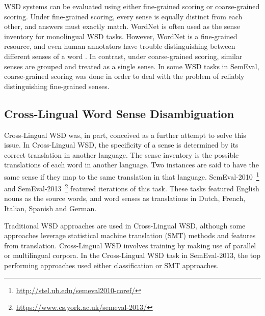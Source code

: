 WSD systems can be evaluated using either fine-grained scoring or
coarse-grained scoring. Under fine-grained scoring, every sense is
equally distinct from each other, and answers must exactly match. 
WordNet is often used as the sense inventory for monolingual WSD tasks. However, WordNet is a fine-grained resource, and even human annotators have
trouble distinguishing between different senses of a word
\cite{edmonds2002introduction}.  In contrast, under coarse-grained
scoring, similar senses are grouped and treated as a single sense.  In
some WSD tasks in SemEval, coarse-grained scoring was done in order
to deal with the problem of reliably distinguishing fine-grained
senses. 

\subsection{Cross-Lingual Word Sense Disambiguation}
Cross-Lingual WSD was, in part, conceived as a further attempt to
solve this issue. In Cross-Lingual WSD, the specificity of a sense is
determined by its correct translation in another language. The sense
inventory is the possible translations of each word in another
language. Two instances are said to have the same sense if they map to
the same translation in that language.
SemEval-2010~\cite{Lefever2010}\footnote{\url{http://stel.ub.edu/semeval2010-coref/}}
and SemEval-2013~\cite{Lefever2013}\footnote{\url{https://www.cs.york.ac.uk/semeval-2013/}}
featured iterations of this task. These tasks featured
English nouns as the source words, and word senses as translations in
Dutch, French, Italian, Spanish and German.

Traditional WSD approaches are used in Cross-Lingual WSD, although
some approaches leverage statistical machine translation (SMT) methods
and features from translation. Cross-Lingual WSD involves training by
making use of parallel or multilingual corpora. In the Cross-Lingual
WSD task in SemEval-2013, the top performing approaches used either
classification or SMT approaches.

